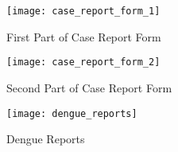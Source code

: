 \begin{figure}[H]
	\centering
	\texttt{[image: case\_report\_form\_1]}
	\caption{First Part of Case Report Form}
	\label{fig:case_report_form_1}
\end{figure}

\begin{figure}[H]
	\centering
	\texttt{[image: case\_report\_form\_2]}
	\caption{Second Part of Case Report Form}
	\label{fig:case_report_form_2}
\end{figure}

\begin{figure}[H]
	\centering
	\texttt{[image: dengue\_reports]}
	\caption{Dengue Reports}
	\label{fig:dengue_reports}
\end{figure}

